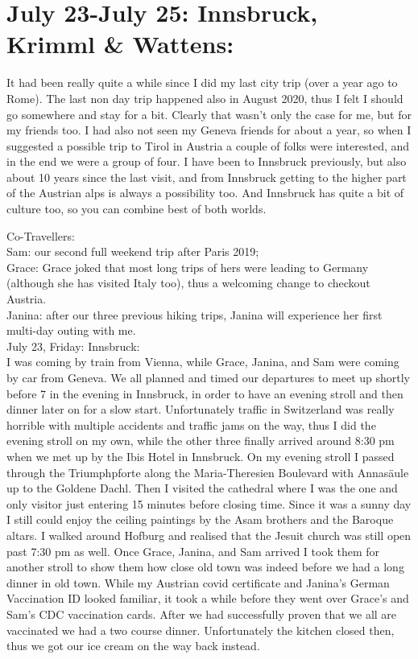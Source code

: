{\section{July 23-July 25: Innsbruck, Krimml \& Wattens:}
\label{2021Innsbruck}

It had been really quite a while since I did my last city trip (over a year ago to Rome). The last non day trip happened also in August 2020, thus I felt I should go somewhere and stay for a bit. Clearly that wasn't only the case for me, but for my friends too.
I had also not seen my Geneva friends for about a year, so when I suggested a possible trip to Tirol in Austria a couple of folks were interested, and in the end we were a group of four. I have been to Innsbruck previously, but also about 10 years since the last visit, and from Innsbruck getting to the higher part of the Austrian alps is always a possibility too. And Innsbruck has quite a bit of culture too, so you can combine best of both worlds.

Co-Travellers:\\
Sam: our second full weekend trip after Paris 2019;\\
Grace: Grace joked that most long trips of hers were leading to Germany (although she has visited Italy too), thus a welcoming change to checkout Austria.\\
Janina: after our three previous hiking trips, Janina will experience her first multi-day outing with me.\\

July 23, Friday: Innsbruck:\\
I was coming by train from Vienna, while Grace, Janina, and Sam were coming by car from Geneva. We all planned and timed our departures to meet up shortly before 7 in the evening in Innsbruck, in order to have an evening stroll and then dinner later on for a slow start.
Unfortunately traffic in Switzerland was really horrible with multiple accidents and traffic jams on the way, thus I did the evening stroll on my own, while the other three finally arrived around 8:30 pm when we met up by the Ibis Hotel in Innsbruck. On my evening stroll I passed through the Triumphpforte along the Maria-Theresien Boulevard with Annas\"aule up to the Goldene Dachl. Then I visited the cathedral where I was the one and only visitor just entering 15 minutes before closing time. Since it was a sunny day I still could enjoy the ceiling paintings by the Asam brothers and the Baroque altars. I walked around Hofburg and realised that the Jesuit church was still open past 7:30 pm as well. Once Grace, Janina, and Sam arrived I took them for another stroll to show them how close old town was indeed before we had a long dinner in old town. While my Austrian covid certificate and Janina's German Vaccination ID looked familiar, it took a while before they went over Grace's and Sam's CDC vaccination cards. After we had successfully proven that we all are vaccinated we had a two course dinner. Unfortunately the kitchen closed then, thus we got our ice cream on the way back instead.\\

}
